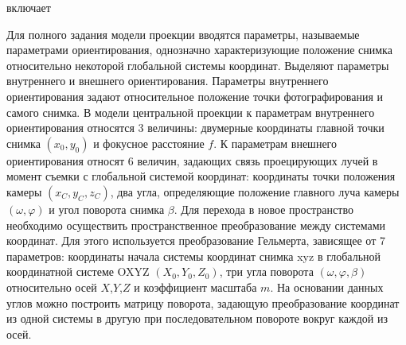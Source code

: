 \begin{SCn}
    \begin{scnrelfromset}{включает}
        \begin{scnindent}    
        \end{scnindent}
    \end{scnrelfromset}
\end{SCn}

Для полного задания модели проекции вводятся параметры, называемые параметрами ориентирования, однозначно характеризующие положение снимка относительно некоторой глобальной системы координат. Выделяют параметры внутреннего и внешнего ориентирования. Параметры внутреннего ориентирования задают относительное положение точки фотографирования и самого снимка. В модели центральной проекции к параметрам внутреннего ориентирования относятся 3 величины: двумерные координаты главной точки снимка $(x_0,y_0)$ и фокусное расстояние $f$. К параметрам внешнего ориентирования относят 6 величин, задающих связь проецирующих лучей в момент съемки с глобальной системой координат: координаты точки положения камеры $(x_C,y_C,z_C)$, два угла, определяющие положение главного луча камеры $(\omega,\varphi)$ и угол поворота снимка $\beta$. Для перехода в новое пространство необходимо осуществить пространственное преобразование между системами координат. Для этого используется преобразование Гельмерта, зависящее от 7 параметров: координаты начала системы координат снимка xyz в глобальной координатной системе OXYZ $(X_0,Y_0,Z_0)$, три угла поворота $(\omega,\varphi, \beta)$ относительно осей $X$,$Y$,$Z$ и коэффициент масштаба $m$. На основании данных углов можно построить матрицу поворота, задающую преобразование координат из одной системы в другую при последовательном повороте вокруг каждой из осей.

